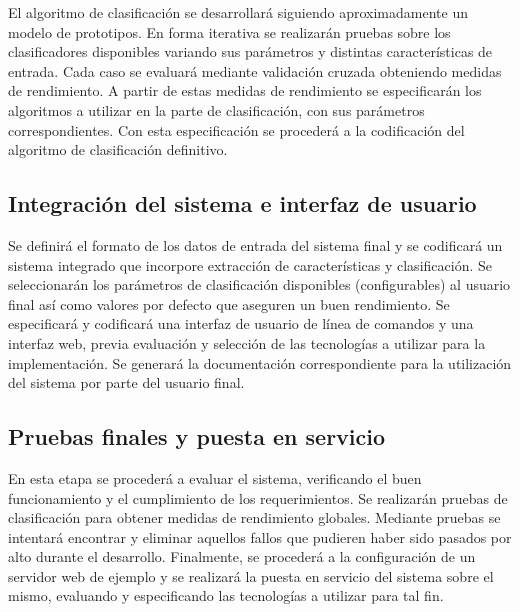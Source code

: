 \documentclass[12pt,bibliography=oldstyle,DIV=12,parskip=full-]{scrartcl}
\begin{document}
El algoritmo de clasificación se desarrollará siguiendo
aproximadamente un modelo de prototipos. En forma iterativa se
realizarán pruebas sobre los clasificadores disponibles variando sus
parámetros y distintas características de entrada. Cada caso se
evaluará mediante validación cruzada obteniendo medidas de
rendimiento. A partir de estas medidas de rendimiento se especificarán
los algoritmos a utilizar en la parte de clasificación, con sus
parámetros correspondientes. Con esta especificación se procederá a la
codificación del algoritmo de clasificación definitivo.
%
%
\subsection{Integración del sistema e interfaz de usuario}
Se definirá el formato de los datos de entrada del sistema final y se
codificará un sistema integrado que incorpore extracción de
características y clasificación. Se seleccionarán los parámetros de
clasificación disponibles (configurables) al usuario final así como
valores por defecto que aseguren un buen rendimiento.
%
Se especificará y codificará una interfaz de usuario de línea de
comandos y una interfaz web, previa evaluación y selección de las
tecnologías a utilizar para la implementación.  Se generará la
documentación correspondiente para la utilización del sistema por
parte del usuario final.
%
\subsection{Pruebas finales y puesta en servicio}
En esta etapa se procederá a evaluar el sistema, verificando el buen
funcionamiento y el cumplimiento de los requerimientos. Se realizarán
pruebas de clasificación para obtener medidas de rendimiento
globales. Mediante pruebas se intentará encontrar y eliminar
aquellos fallos que pudieren haber sido pasados por alto durante el
desarrollo.
%
Finalmente, se procederá a la configuración de un servidor web de
ejemplo y se realizará la puesta en servicio del sistema sobre el
mismo, evaluando y especificando las tecnologías a utilizar para tal
fin.
%
%
\newpage
\end{document}
